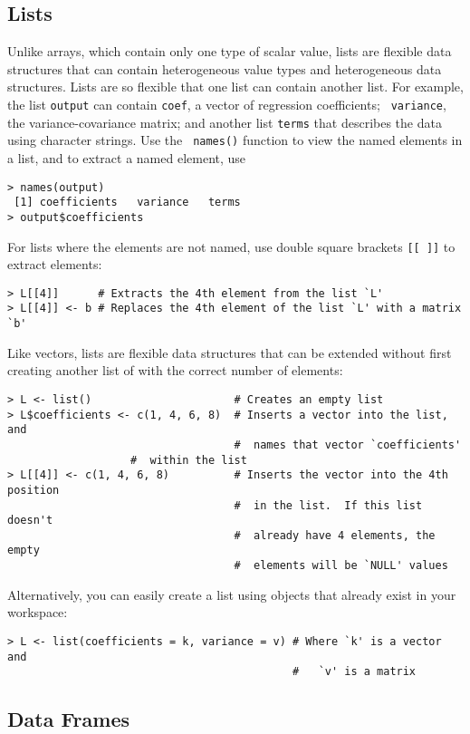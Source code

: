 \subsection{Lists}

Unlike arrays, which contain only one type of scalar value, lists
are flexible data structures that can contain heterogeneous value types
and heterogeneous data structures.  Lists are so flexible that one list
can contain another list.  For example, the list {\tt output} can
contain {\tt coef}, a vector of regression coefficients; {\tt
variance}, the variance-covariance matrix; and another list {\tt terms}
that describes the data using character strings.  Use the {\tt
names()} function to view the named elements in a list, and to extract
a named element, use
\begin{verbatim}
> names(output)
 [1] coefficients   variance   terms
> output$coefficients
\end{verbatim}
For lists where the elements are not named, use double square brackets
\verb|[[ ]]| to extract elements:  
\begin{verbatim}
> L[[4]]      # Extracts the 4th element from the list `L'
> L[[4]] <- b # Replaces the 4th element of the list `L' with a matrix `b'
\end{verbatim}

Like vectors, lists are flexible data structures that can be extended
without first creating another list of with the correct number of
elements:  
\begin{verbatim}
> L <- list()                      # Creates an empty list
> L$coefficients <- c(1, 4, 6, 8)  # Inserts a vector into the list, and 
                                   #  names that vector `coefficients' 
				   #  within the list
> L[[4]] <- c(1, 4, 6, 8)          # Inserts the vector into the 4th position
                                   #  in the list.  If this list doesn't 
                                   #  already have 4 elements, the empty 
                                   #  elements will be `NULL' values
\end{verbatim}
Alternatively, you can easily create a list using objects that already
exist in your workspace:  
\begin{verbatim}
> L <- list(coefficients = k, variance = v) # Where `k' is a vector and
                                            #   `v' is a matrix
\end{verbatim}

\subsection{Data Frames}

